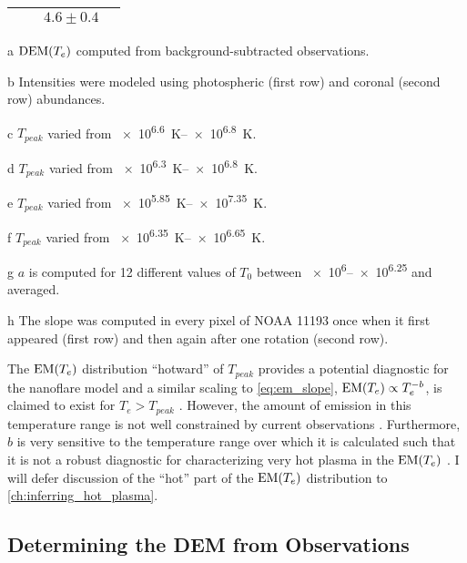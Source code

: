 \begin{table}[!h]
\begin{threeparttable}
\begin{tabularx}{\columnwidth}{lcCC}
        & & $4.6\pm0.4$ & \\
        \bottomrule
    \end{tabularx}
    \begin{tablenotes}
        \footnotesize
        \item[a] $\textup{DEM}(T_e)$ computed from background-subtracted observations.
        \item[b] Intensities were modeled using photospheric (first row) and coronal (second row) abundances.
        \item[c] $T_{peak}$ varied from \SIrange{e6.6}{e6.8}{\kelvin}.
        \item[d] $T_{peak}$ varied from \SIrange{e6.3}{e6.8}{\kelvin}.
        \item[e] $T_{peak}$ varied from \SIrange{e5.85}{e7.35}{\kelvin}.
        \item[f] $T_{peak}$ varied from \SIrange{e6.35}{e6.65}{\kelvin}.
        \item[g] $a$ is computed for 12 different values of $T_0$ between \numrange[range-phrase = and]{e6}{e6.25} and averaged.
        \item[h] The slope was computed in every pixel of \AR{} NOAA 11193 once when it first appeared (first row) and then again after one rotation (second row). 
    \end{tablenotes}
\end{threeparttable}
\end{table}

The $\textup{EM}(T_e)$ distribution ``hotward'' of $T_{peak}$ provides a potential diagnostic for the nanoflare model \citep{cargill_implications_1994,cargill_nanoflare_2004} and a similar scaling to \autoref{eq:em_slope}, $\textup{EM}(T_e)\propto T_e^{-b}$, is claimed to exist for $T_e>T_{peak}$ \citep[e.g.][]{warren_systematic_2012}. However, the amount of emission in this temperature range is not well constrained by current observations \citep{winebarger_defining_2012}. Furthermore, $b$ is very sensitive to the temperature range over which it is calculated such that it is not a robust diagnostic for characterizing very hot plasma in the $\textup{EM}(T_e)$ \citep{barnes_inference_2016-1}. I will defer discussion of the ``hot'' part of the $\textup{EM}(T_e)$ distribution to \autoref{ch:inferring_hot_plasma}.

\subsection{Determining the DEM from Observations}

